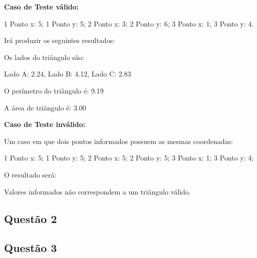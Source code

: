 	\textbf{Caso de Teste válido:}


		1 Ponto x: 5; 1 Ponto y: 5; 2 Ponto x: 3; 2 Ponto y: 6; 3 Ponto x: 1; 3 Ponto y: 4.

		Irá produzir os seguintes resultados:

	 Os lados do triângulo são:

		Lado A: 2.24, Lado B: 4.12, Lado C: 2.83

	 O perímetro do triângulo é: 9.19

	 A área de triângulo é: 3.00

	\textbf{Caso de Teste inválido:}

		Um caso em que dois pontos informados possuem as mesmas coordenadas:

		1 Ponto x: 5; 1 Ponto y: 5; 2 Ponto x: 5; 2 Ponto y: 5; 3 Ponto x: 1; 3  Ponto y: 4;

		O resultado será:

		Valores informados não correspondem a um triângulo válido.

\subsection{Questão 2}
\subsection{Questão 3}





